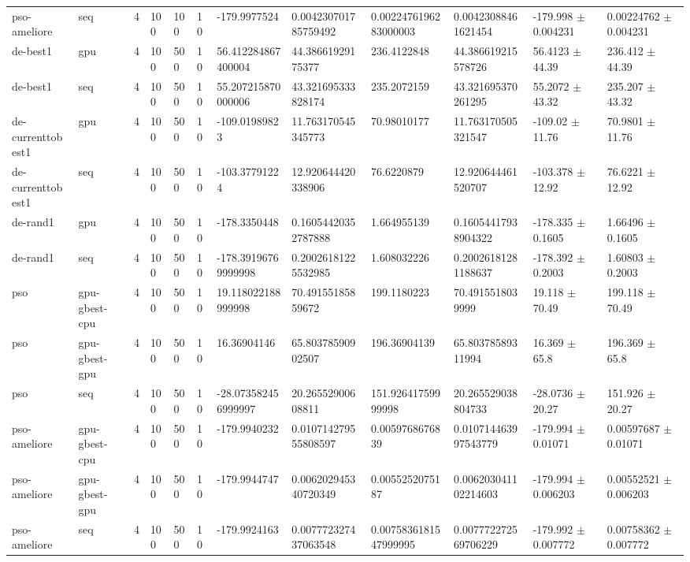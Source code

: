 \begin{table}[t]
\begin{tabular}{llllllllllll}
pso-ameliore & seq & 4 & 100 & 100 & 10 & -179.9977524 & 0.004230701785759492 & 0.0022476196283000003 & 0.00423088461621454 & -179.998 $\pm$ 0.004231 & 0.00224762 $\pm$ 0.004231 \\
de-best1 & gpu & 4 & 100 & 500 & 10 & 56.412284867400004 & 44.38661929175377 & 236.4122848 & 44.386619215578726 & 56.4123 $\pm$ 44.39 & 236.412 $\pm$ 44.39 \\
de-best1 & seq & 4 & 100 & 500 & 10 & 55.207215870000006 & 43.321695333828174 & 235.2072159 & 43.321695370261295 & 55.2072 $\pm$ 43.32 & 235.207 $\pm$ 43.32 \\
de-currenttobest1 & gpu & 4 & 100 & 500 & 10 & -109.01989823 & 11.763170545345773 & 70.98010177 & 11.763170505321547 & -109.02 $\pm$ 11.76 & 70.9801 $\pm$ 11.76 \\
de-currenttobest1 & seq & 4 & 100 & 500 & 10 & -103.37791224 & 12.920644420338906 & 76.6220879 & 12.920644461520707 & -103.378 $\pm$ 12.92 & 76.6221 $\pm$ 12.92 \\
de-rand1 & gpu & 4 & 100 & 500 & 10 & -178.3350448 & 0.16054420352787888 & 1.664955139 & 0.16054417938904322 & -178.335 $\pm$ 0.1605 & 1.66496 $\pm$ 0.1605 \\
de-rand1 & seq & 4 & 100 & 500 & 10 & -178.39196769999998 & 0.20026181225532985 & 1.608032226 & 0.20026181281188637 & -178.392 $\pm$ 0.2003 & 1.60803 $\pm$ 0.2003 \\
pso & gpu-gbest-cpu & 4 & 100 & 500 & 10 & 19.118022188999998 & 70.49155185859672 & 199.1180223 & 70.4915518039999 & 19.118 $\pm$ 70.49 & 199.118 $\pm$ 70.49 \\
pso & gpu-gbest-gpu & 4 & 100 & 500 & 10 & 16.36904146 & 65.80378590902507 & 196.36904139 & 65.80378589311994 & 16.369 $\pm$ 65.8 & 196.369 $\pm$ 65.8 \\
pso & seq & 4 & 100 & 500 & 10 & -28.073582456999997 & 20.26552900608811 & 151.92641759999998 & 20.265529038804733 & -28.0736 $\pm$ 20.27 & 151.926 $\pm$ 20.27 \\
pso-ameliore & gpu-gbest-cpu & 4 & 100 & 500 & 10 & -179.9940232 & 0.010714279555808597 & 0.0059768676839 & 0.010714463997543779 & -179.994 $\pm$ 0.01071 & 0.00597687 $\pm$ 0.01071 \\
pso-ameliore & gpu-gbest-gpu & 4 & 100 & 500 & 10 & -179.9944747 & 0.006202945340720349 & 0.0055252075187 & 0.006203041102214603 & -179.994 $\pm$ 0.006203 & 0.00552521 $\pm$ 0.006203 \\
pso-ameliore & seq & 4 & 100 & 500 & 10 & -179.9924163 & 0.007772327437063548 & 0.0075836181547999995 & 0.007772272569706229 & -179.992 $\pm$ 0.007772 & 0.00758362 $\pm$ 0.007772 \\
\bottomrule
\end{tabular}
\end{table}
